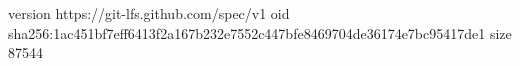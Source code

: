 version https://git-lfs.github.com/spec/v1
oid sha256:1ac451bf7eff6413f2a167b232e7552c447bfe8469704de36174e7bc95417de1
size 87544
